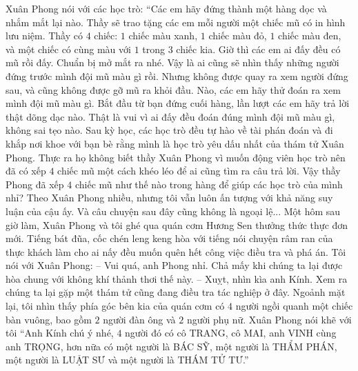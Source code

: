 	\vskip 0.1cm
	\textbf{\color{toancuabi}{Chiếc mũ kỷ niệm}}
	\vskip 0.1cm
	Xuân Phong nói với các học trò: “Các em hãy đứng thành một hàng dọc và nhắm mắt lại nào. Thầy sẽ trao tặng các em mỗi người một chiếc mũ có in hình lưu niệm. Thầy có $4$ chiếc: $1$ chiếc màu xanh, $1$ chiếc màu đỏ, $1$ chiếc màu đen, và một chiếc có cùng màu với $1$ trong $3$ chiếc kia. Giờ thì các em ai đấy đều có mũ rồi đấy. Chuẩn bị mở mắt ra nhé. Vậy là ai cũng sẽ nhìn thấy những người đứng trước mình đội mũ màu gì rồi. Nhưng không được quay ra xem người đứng sau, và cũng không được gỡ mũ ra khỏi đầu. Nào, các em hãy thử đoán ra xem mình đội mũ màu gì. Bắt đầu từ bạn đứng cuối hàng, lần lượt các em hãy trả lời thật dõng dạc nào. 
	\vskip 0.1cm
	Thật là vui vì ai đấy đều đoán đúng mình đội mũ màu gì, không sai tẹo nào. Sau kỳ học, các học trò đều tự hào về tài phán đoán và đi khắp nơi khoe với bạn bè rằng mình là học trò yêu dấu nhất của thám tử Xuân Phong. Thực ra họ không biết thầy Xuân Phong vì muốn động viên học trò nên đã có xếp $4$ chiếc mũ một cách khéo léo để ai cũng tìm ra câu trả lời. 
	\vskip 0.1cm
	Vậy thầy Phong đã xếp $4$ chiếc mũ như thế nào trong hàng để giúp các học trò của mình nhỉ? 
	\vskip 0.1cm
	Theo Xuân Phong nhiều, nhưng tôi vẫn luôn ấn tượng với khả năng suy luận của cậu ấy. Và câu chuyện sau đây cũng không là ngoại lệ...
	\vskip 0.1cm
	\textbf{\color{toancuabi}{Vị thám tử ẩn danh}}
	\vskip 0.1cm
	Một hôm sau giờ làm, Xuân Phong và tôi ghé qua quán cơm Hương Sen thưởng thức thực đơn mới. Tiếng bát đũa, cốc chén leng keng hòa với tiếng nói chuyện râm ran của thực khách làm cho ai nấy đều muốn quên hết công việc điều tra và phá án. 
	\vskip 0.1cm
	Tôi nói với Xuân Phong: 
	\vskip 0.1cm
	-- Vui quá, anh Phong nhỉ. Chả mấy khi chúng ta lại được hòa chung với không khí thảnh thơi thế này. 
	\vskip 0.1cm
	-- Xuỵt, nhìn kìa anh Kính. Xem ra chúng ta lại gặp một thám tử cũng đang điều tra tác nghiệp ở đây. 
	\vskip 0.1cm
	Ngoảnh mặt lại, tôi nhìn thấy phía góc bên kia của quán cơm có $4$ người ngồi quanh một chiếc bàn vuông, bao gồm $2$ người đàn ông và $2$ người phụ nữ. Xuân Phong nói khẽ với tôi “Anh Kính chú ý nhé, $4$ người đó có cô TRANG, cô MAI, anh VINH cùng anh TRỌNG, hơn nữa có một người là BÁC SỸ, một người là THẨM PHÁN, một người là LUẬT SƯ và một người là THÁM TỬ TƯ.” 
